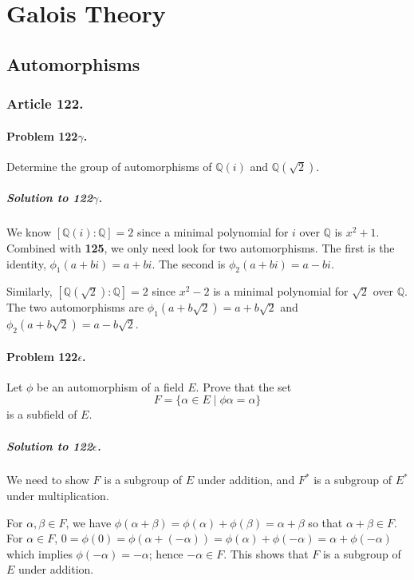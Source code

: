\chapter{Galois Theory}

\section{Automorphisms}


\subsection{Article 122.}

\subsubsection{Problem 122$\gamma$.}
Determine the group of automorphisms of $\mathbb{Q}(i)$ and $\mathbb{Q}(\sqrt{2})$.

\paragraph*{Solution to 122$\gamma$.}
We know $[\mathbb{Q}(i) : \mathbb{Q}] = 2$ since a minimal polynomial for $i$ over
$\mathbb{Q}$ is $x^2 + 1$. Combined with \textbf{125}, we only need look for
two automorphisms. The first is the identity, $\phi_1 (a + bi) = a+bi$. The
second is $\phi_2 (a+bi) = a- bi$.

Similarly, $[\mathbb{Q}(\sqrt{2}) : \mathbb{Q}] = 2$ since $x^2 - 2$ is a minimal
polynomial for $\sqrt{2}$ over $\mathbb{Q}$. The two automorphisms are
$\phi_1 (a+b\sqrt{2}) = a + b\sqrt{2}$ and $\phi_2 (a +b\sqrt{2}) = a-b\sqrt{2}$.

\subsubsection{Problem 122$\epsilon$.}
Let $\phi$ be an automorphism of a field $E$. Prove that the set
$$ F = \{ \alpha \in E \mid \phi \alpha = \alpha \} $$
is a subfield of $E$.

\paragraph*{Solution to 122$\epsilon$.}
We need to show $F$ is a subgroup of $E$ under addition, and $F^*$ is a subgroup
of $E^*$ under multiplication.

For $\alpha, \beta \in F$, we have
$\phi (\alpha + \beta) = \phi(\alpha) + \phi(\beta) = \alpha + \beta$ so that
$\alpha + \beta \in F$. For $\alpha \in F$, $0 = \phi(0) = \phi (\alpha + (-\alpha)) =
\phi(\alpha) + \phi(-\alpha) = \alpha + \phi(-\alpha)$ which implies
$\phi(-\alpha) = -\alpha$; hence $-\alpha \in F$. This shows that $F$ is a
subgroup of $E$ under addition.

